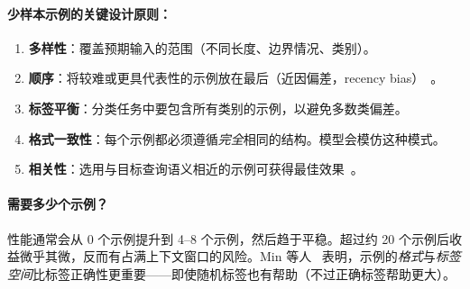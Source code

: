 \paragraph{少样本示例的关键设计原则：}
\label{key-design-principles-for-few-shot-examples}

\begin{enumerate}
  \item \textbf{多样性}：覆盖预期输入的范围（不同长度、边界情况、类别）。
  \item \textbf{顺序}：将较难或更具代表性的示例放在最后（近因偏差，recency bias）~\cite{lu2022fantastically}。
  \item \textbf{标签平衡}：分类任务中要包含所有类别的示例，以避免多数类偏差。
  \item \textbf{格式一致性}：每个示例都必须遵循\emph{完全}相同的结构。模型会模仿这种模式。
  \item \textbf{相关性}：选用与目标查询语义相近的示例可获得最佳效果~\cite{liu2022makes}。
\end{enumerate}

\paragraph{需要多少个示例？}
\label{how-many-shots}

性能通常会从 0 个示例提升到 4--8 个示例，然后趋于平稳。超过约 20 个示例后收益微乎其微，反而有占满上下文窗口的风险。Min 等人~\cite{min2022rethinking} 表明，示例的\emph{格式}与\emph{标签空间}比标签正确性更重要——即使随机标签也有帮助（不过正确标签帮助更大）。


